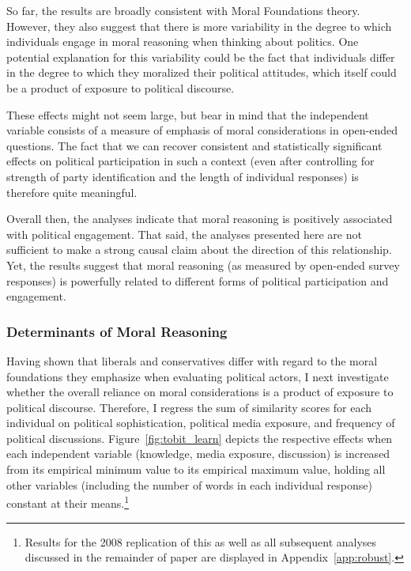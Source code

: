 \documentclass[12pt]{article}
\begin{document}
So far, the results are broadly consistent with Moral Foundations theory. However, they also suggest that there is more variability in the degree to which individuals engage in moral reasoning when thinking about politics. One potential explanation for this variability could be the fact that individuals differ in the degree to which they moralized their political attitudes, which itself could be a product of exposure to political discourse.

These effects might not seem large, but bear in mind that the independent variable consists of a measure of emphasis of moral considerations in open-ended questions. The fact that we can recover consistent and statistically significant effects on political participation in such a context (even after controlling for strength of party identification and the length of individual responses) is therefore quite meaningful.

Overall then, the analyses indicate that moral reasoning is positively associated with political engagement. That said, the analyses presented here are not sufficient to make a strong causal claim about the direction of this relationship. Yet, the results suggest that moral reasoning (as measured by open-ended survey responses) is powerfully related to different forms of political participation and engagement.



\subsubsection{Determinants of Moral Reasoning}

Having shown that liberals and conservatives differ with regard to the moral foundations they emphasize when evaluating political actors, I next investigate whether the overall reliance on moral considerations is a product of exposure to political discourse. Therefore, I regress the sum of similarity scores for each individual on political sophistication, political media exposure, and frequency of political discussions. Figure~\ref{fig:tobit_learn} depicts the respective effects when each independent variable (knowledge, media exposure, discussion) is increased from its empirical minimum value to its empirical maximum value, holding all other variables (including the number of words in each individual response) constant at their means.\footnote{Results for the 2008 replication of this as well as all subsequent analyses discussed in the remainder of paper are displayed in Appendix~\ref{app:robust}.}
\end{document}
